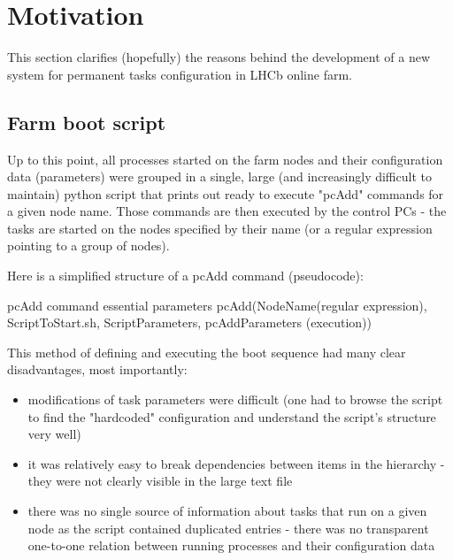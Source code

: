 \documentclass{customization}
\begin{document}

\newpage
\section{Motivation}
\hspace{0.6cm}

This section clarifies (hopefully) the reasons behind the development of a new system for permanent tasks configuration in LHCb online farm.


\subsection{Farm boot script}
\hspace{0.6cm}

Up to this point, all processes started on the farm nodes and their configuration data (parameters) were grouped in a single, large (and increasingly difficult to maintain) python script that prints out ready to execute "pcAdd" commands for a given node name. Those commands are then executed by the control PCs - the tasks are started on the nodes specified by their name (or a regular expression pointing to a group of nodes).
\newline

\noindent
Here is a simplified structure of a pcAdd command (pseudocode):
\newline

\begin{sexylisting}[colback=white]{pcAdd command essential parameters}
pcAdd(NodeName(regular expression), ScriptToStart.sh, 
      ScriptParameters, pcAddParameters (execution))
\end{sexylisting}

\noindent
This method of defining and executing the boot sequence had many clear disadvantages, most importantly:

\begin{itemize}
    \item modifications of task parameters were difficult (one had to browse the script to find the "hardcoded" configuration and understand the script's structure very well)
    \item it was relatively easy to break dependencies between items in the hierarchy - they were not clearly visible in the large text file
    \item there was no single source of information about tasks that run on a given node as the script contained duplicated entries - there was no transparent one-to-one relation between running processes and their configuration data
\end{itemize}
\end{document}
